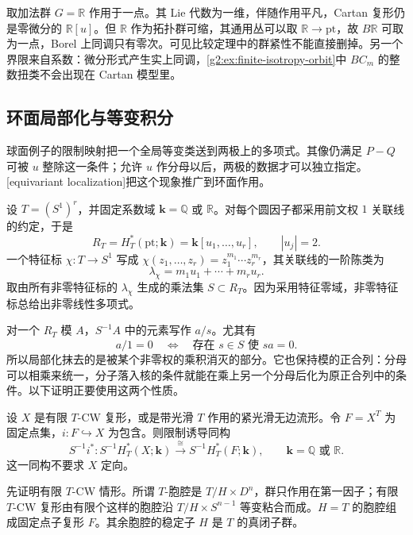 \begin{example}\label{g2:ex:noncompact-group-cartan-failure}
	取加法群 \(G=\mathbb R\) 作用于一点。其 Lie 代数为一维，伴随作用平凡，Cartan 复形仍是零微分的 \(\mathbb R[u]\)。但 \(\mathbb R\) 作为拓扑群可缩，其通用丛可以取 \(\mathbb R\to\mathrm{pt}\)，故 \(B\mathbb R\) 可取为一点，Borel 上同调只有零次。可见比较定理中的群紧性不能直接删掉。另一个界限来自系数：微分形式产生实上同调，\cref{g2:ex:finite-isotropy-orbit}中 \(BC_m\) 的整数扭类不会出现在 Cartan 模型里。
\end{example}

\subsection{环面局部化与等变积分}
\label{g2:subsec:C01:06}

球面例子的限制映射把一个全局等变类送到两极上的多项式。其像仍满足 \(P-Q\) 可被 \(u\) 整除这一条件；允许 \(u\) 作分母以后，两极的数据才可以独立指定。[equivariant localization]把这个现象推广到环面作用。

\ProseParagraphBreak
设 \(T=(S^1)^r\)，并固定系数域 \(\mathbf k=\mathbb Q\) 或 \(\mathbb R\)。对每个圆因子都采用前文权 \(1\) 关联线的约定，于是
\[
	R_T=H_T^*(\mathrm{pt};\mathbf k)=\mathbf k[u_1,\ldots,u_r],\qquad |u_j|=2.
\]
一个特征标 \(\chi\colon T\to S^1\) 写成 \(\chi(z_1,\ldots,z_r)=z_1^{m_1}\cdots z_r^{m_r}\)，其关联线的一阶陈类为
\[
	\lambda_\chi=m_1u_1+\cdots+m_ru_r.
\]
取由所有非零特征标的 \(\lambda_\chi\) 生成的乘法集 \(S\subset R_T\)。因为采用特征零域，非零特征标总给出非零线性多项式。

\ProseParagraphBreak
对一个 \(R_T\) 模 \(A\)，\(S^{-1}A\) 中的元素写作 \(a/s\)。尤其有
\[
	a/1=0\quad\Longleftrightarrow\quad\text{存在 }s\in S\text{ 使 }sa=0.
\]
所以局部化抹去的是被某个非零权的乘积消灭的部分。它也保持模的正合列：分母可以相乘来统一，分子落入核的条件就能在乘上另一个分母后化为原正合列中的条件。以下证明正要使用这两个性质。

\begin{theorem}[环面局部化定理]\label{g2:thm:torus-localization}
	设 \(X\) 是有限 \(T\)-CW 复形，或是带光滑 \(T\) 作用的紧光滑无边流形。令 \(F=X^T\) 为固定点集，\(i\colon F\hookrightarrow X\) 为包含。则限制诱导同构
	\[
		S^{-1}i^*\colon S^{-1}H_T^*(X;\mathbf k)
		\xrightarrow{\;\cong\;}S^{-1}H_T^*(F;\mathbf k),
		\qquad \mathbf k=\mathbb Q\text{ 或 }\mathbb R.
	\]
	这一同构不要求 \(X\) 定向。
\end{theorem}

先证明有限 \(T\)-CW 情形。所谓 \(T\)-胞腔是 \(T/H\times D^n\)，群只作用在第一因子；有限 \(T\)-CW 复形由有限个这样的胞腔沿 \(T/H\times S^{n-1}\) 等变粘合而成。\(H=T\) 的胞腔组成固定点子复形 \(F\)。其余胞腔的稳定子 \(H\) 是 \(T\) 的真闭子群。

